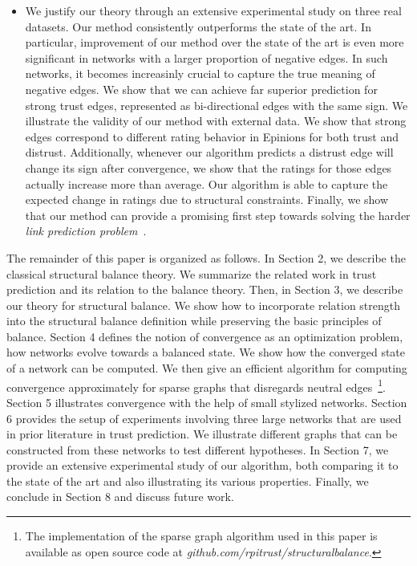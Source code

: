 \documentclass[acmtweb]{acmsmall}
\begin{document}
\begin{itemize}
\item We justify our theory through an extensive experimental study on
  three real datasets. Our method consistently outperforms the state
  of the art. In particular, improvement of our method over the state
  of the art is even more significant in networks with a larger
  proportion of negative edges. In such networks, it becomes
  increasinly crucial to capture the true meaning of negative
  edges. We show that we can achieve far superior prediction for
  strong trust edges, represented as bi-directional edges with the
  same sign. We illustrate the validity of our method with external
  data. We show that strong edges correspond to different rating
  behavior in Epinions for both trust and distrust. Additionally,
  whenever our algorithm predicts a distrust edge will change its sign
  after convergence, we show that the ratings for those edges actually
  increase more than average. Our algorithm is able to capture the
  expected change in ratings due to structural constraints. Finally,
  we show that our method can provide a promising first step towards
  solving the harder {\it link prediction
    problem}~\cite{Kleinberg:03}.
\end{itemize}

The remainder of this paper is organized as follows. In Section 2, we
describe the classical structural balance theory. We summarize the
related work in trust prediction and its relation to the balance
theory. Then, in Section 3, we describe our theory for structural
balance. We show how to incorporate relation strength into the
structural balance definition while preserving the basic principles of
balance. Section 4 defines the notion of convergence as an
optimization problem, how networks evolve towards a balanced state. We
show how the converged state of a network can be computed. We then
give an efficient algorithm for computing convergence approximately
for sparse graphs that disregards neutral edges~\footnote{The
  implementation of the sparse graph algorithm used in this paper is
  available as open source code at {\em
    github.com/rpitrust/structuralbalance}.}. Section 5 illustrates
convergence with the help of small stylized networks. Section 6
provides the setup of experiments involving three large networks that
are used in prior literature in trust prediction. We illustrate
different graphs that can be constructed from these networks to test
different hypotheses. In Section 7, we provide an extensive
experimental study of our algorithm, both comparing it to the state of
the art and also illustrating its various properties. Finally, we
conclude in Section 8 and discuss future work. 
\end{document}
